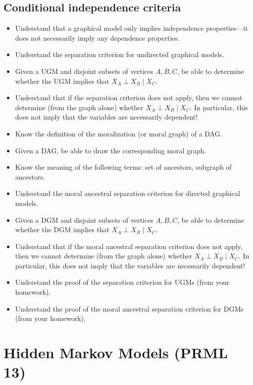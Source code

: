 \documentclass[12pt]{article}
\begin{document}
\subsection{Conditional independence criteria}
\begin{itemize}
\item Understand that a graphical model only implies independence properties---it does not necessarily imply any dependence properties.
\item Understand the separation criterion for undirected graphical models.
\item Given a UGM and disjoint subsets of vertices $A,B,C$, be able to determine whether the UGM implies that $X_A \perp X_B \mid X_C$.
\item Understand that if the separation criterion does not apply, then we cannot determine (from the graph alone) whether $X_A \perp X_B \mid X_C$. In particular, this does not imply that the variables are necessarily dependent!
\item Know the definition of the moralization (or moral graph) of a DAG.
\item Given a DAG, be able to draw the corresponding moral graph.
\item Know the meaning of the following terms: set of ancestors, subgraph of ancestors.
\item Understand the moral ancestral separation criterion for directed graphical models.
\item Given a DGM and disjoint subsets of vertices $A,B,C$, be able to determine whether the DGM implies that $X_A \perp X_B \mid X_C$.
\item Understand that if the moral ancestral separation criterion does not apply, then we cannot determine (from the graph alone) whether $X_A \perp X_B \mid X_C$. In particular, this does not imply that the variables are necessarily dependent!
\item Understand the proof of the separation criterion for UGMs (from your homework).
\item Understand the proof of the moral ancestral separation criterion for DGMs (from your homework).
\end{itemize}


\section{Hidden Markov Models (PRML 13)}
\end{document}
